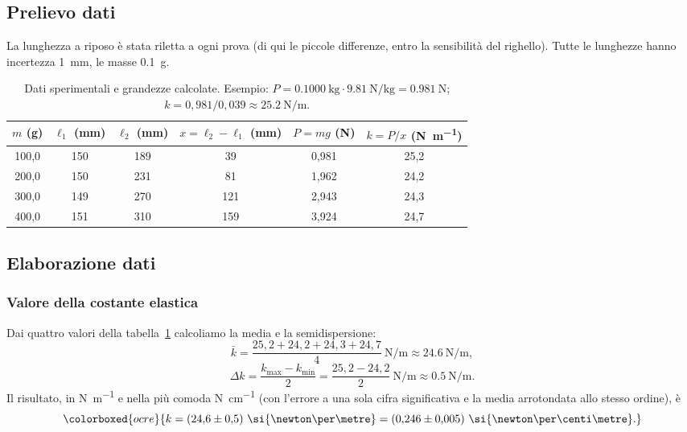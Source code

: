 \subsection{Prelievo dati}
La lunghezza a riposo è stata riletta a ogni prova (di qui le piccole differenze, entro la sensibilità del righello). Tutte le lunghezze hanno incertezza \SI{1}{\milli\metre}, le masse \SI{0,1}{\gram}.

\begin{table}[!htbp]
\centering
\begin{tabular}{@{}cccccc@{}}
\toprule
$m$ (\si{\gram}) & $\ell_1$ (\si{\milli\metre}) & $\ell_2$ (\si{\milli\metre}) & $x=\ell_2-\ell_1$ (\si{\milli\metre}) & $P=mg$ (\si{\newton}) & $k=P/x$ (\si{\newton\per\metre}) \\
\midrule
100,0 & 150 & 189 & 39  & 0,981 & 25,2 \\
200,0 & 150 & 231 & 81  & 1,962 & 24,2 \\
300,0 & 149 & 270 & 121 & 2,943 & 24,3 \\
400,0 & 151 & 310 & 159 & 3,924 & 24,7 \\
\bottomrule
\end{tabular}
\caption{Dati sperimentali e grandezze calcolate. Esempio: $P=\SI{0,1000}{\kilo\gram}\cdot\SI{9,81}{\newton\per\kilo\gram}=\SI{0,981}{\newton}$; $k=0{,}981/0{,}039\approx\SI{25,2}{\newton\per\metre}$.}
\label{tab:hooke-relazione}
\end{table}

\subsection{Elaborazione dati}

\subsubsection{Valore della costante elastica}
Dai quattro valori della tabella~\ref{tab:hooke-relazione} calcoliamo la media e la semidispersione:
\[ \bar k = \frac{25{,}2+24{,}2+24{,}3+24{,}7}{4}\ \si{\newton\per\metre} \approx \SI{24,6}{\newton\per\metre}, \]
\[ \Delta k = \frac{k_{\max}-k_{\min}}{2} = \frac{25{,}2-24{,}2}{2}\ \si{\newton\per\metre} \approx \SI{0,5}{\newton\per\metre}. \]
Il risultato, in \si{\newton\per\metre} e nella più comoda \si{\newton\per\centi\metre} (con l'errore a una sola cifra significativa e la media arrotondata allo stesso ordine), è
\[ \colorboxed{ocre}{ k = (24{,}6 \pm 0{,}5)\ \si{\newton\per\metre} = (0{,}246 \pm 0{,}005)\ \si{\newton\per\centi\metre}. } \]

